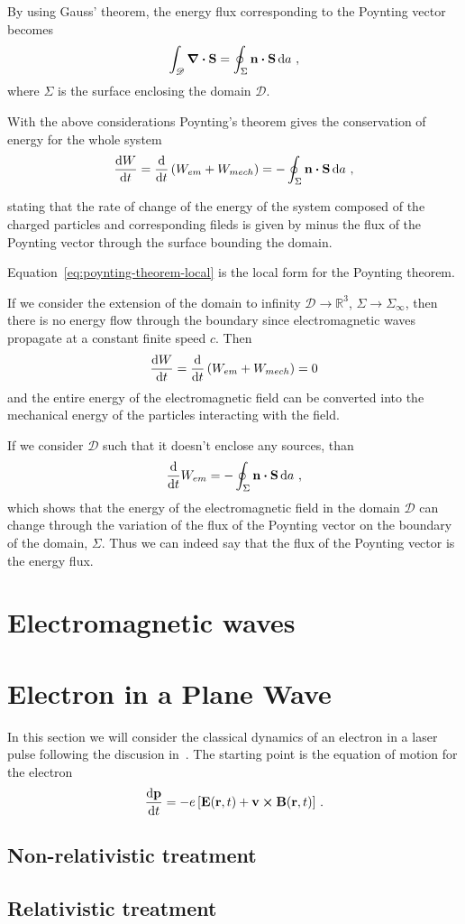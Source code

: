 \documentclass[12pt, class=report, crop=false]{standalone}
\begin{document}
By using Gauss' theorem, the energy flux corresponding to the
Poynting vector becomes
\[
  \int_{\mathscr{D}} \div{\vb{S}} = \oint_\Sigma \vb{n} \vdot \vb{S} \dd{a}\,,
\]
where \(\Sigma\) is the surface enclosing the domain \(\mathscr{D}\).

With the above considerations Poynting's theorem gives the conservation of energy for the whole system
\begin{equation}
  \label{eq:poynting-theorem}
  \dv{W}{t} = \dv{t} \left( W_{em} + W_{mech} \right) =
  -\oint_\Sigma \vb{n} \vdot \vb{S} \dd{a}\,,
\end{equation}

stating that the rate of change of the energy of the system composed of the charged
particles and corresponding fileds is given by minus the flux of the
Poynting vector through the surface bounding the domain.

Equation~\eqref{eq:poynting-theorem-local} is the local form for the Poynting
theorem.

If we consider the extension of the domain to infinity \(\mathscr{D} \to \mathbb{R}^3\),
\(\Sigma \to \Sigma_\infty\), then there is no energy flow through the
boundary since electromagnetic waves propagate at a constant finite speed \(c\). Then
\[
  \dv{W}{t} = \dv{t} \left( W_{em} + W_{mech} \right) = 0
\]
and the entire energy of the electromagnetic field can be converted into
the mechanical energy of the particles interacting with the field.

If we consider \(\mathscr{D}\) such that it doesn't enclose any sources, than
\[
  \dv{t} W_{em} = -\oint_\Sigma \vb{n} \vdot \vb{S} \dd{a}\,,
\]
which shows that the energy of the electromagnetic field in the domain
\(\mathscr{D}\) can change through the variation of the flux of the
Poynting vector on the boundary of the domain, \(\Sigma\). Thus we can
indeed say that the flux of the Poynting vector is the energy flux.

\section{Electromagnetic waves}


\section{Electron in a Plane Wave}

In this section we will consider the classical dynamics of an electron in a
laser pulse following the discusion in~\textcite{karsch_applicationshigh_2018}.
The starting point is the equation of motion for the electron
\begin{equation}
  \label{eq:lorentz-eom}
  \dv{\vb{p}}{t} = -e \left[ \vb{E}(\vb{r}, t) + \vb{v} \cp \vb{B}(\vb{r}, t) \right]\,.
\end{equation}

\subsection{Non-relativistic treatment}

\subsection{Relativistic treatment}
\end{document}

